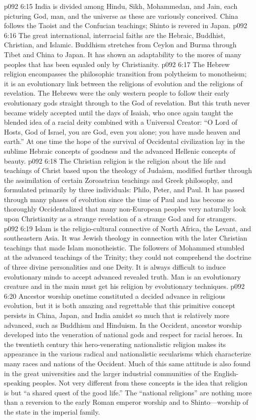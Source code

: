 \vs p092 6:15 India is divided among Hindu, Sikh, Mohammedan, and Jain, each picturing God, man, and the universe as these are variously conceived. China follows the Taoist and the Confucian teachings; Shinto is revered in Japan.
\vs p092 6:16 The great international, interracial faiths are the Hebraic, Buddhist, Christian, and Islamic. Buddhism stretches from Ceylon and Burma through Tibet and China to Japan. It has shown an adaptability to the mores of many peoples that has been equaled only by Christianity.
\vs p092 6:17 The Hebrew religion encompasses the philosophic transition from polytheism to monotheism; it is an evolutionary link between the religions of evolution and the religions of revelation. The Hebrews were the only western people to follow their early evolutionary gods straight through to the God of revelation. But this truth never became widely accepted until the days of Isaiah, who once again taught the blended idea of a racial deity combined with a Universal Creator: “O Lord of Hosts, God of Israel, you are God, even you alone; you have made heaven and earth.” At one time the hope of the survival of Occidental civilization lay in the sublime Hebraic concepts of goodness and the advanced Hellenic concepts of beauty.\plusone
\vs p092 6:18 The Christian religion is the religion about the life and teachings of Christ based upon the theology of Judaism, modified further through the assimilation of certain Zoroastrian teachings and Greek philosophy, and formulated primarily by three individuals: Philo, Peter, and Paul. It has passed through many phases of evolution since the time of Paul and has become so thoroughly Occidentalized that many non\hyp{}European peoples very naturally look upon Christianity as a strange revelation of a strange God and for strangers.
\vs p092 6:19 Islam is the religio\hyp{}cultural connective of North Africa, the Levant, and southeastern Asia. It was Jewish theology in connection with the later Christian teachings that made Islam monotheistic. The followers of Mohammed stumbled at the advanced teachings of the Trinity; they could not comprehend the doctrine of three divine personalities and one Deity. It is always difficult to induce evolutionary minds  to accept advanced revealed truth. Man is an evolutionary creature and in the main must get his religion by evolutionary techniques.
\pc \vs p092 6:20 Ancestor worship onetime constituted a decided advance in religious evolution, but it is both amazing and regrettable that this primitive concept persists in China, Japan, and India amidst so much that is relatively more advanced, such as Buddhism and Hinduism. In the Occident, ancestor worship developed into the veneration of national gods and respect for racial heroes. In the twentieth century this hero\hyp{}venerating nationalistic religion makes its appearance in the various radical and nationalistic secularisms which characterize many races and nations of the Occident. Much of this same attitude is also found in the great universities and the larger industrial communities of the English\hyp{}speaking peoples. Not very different from these concepts is the idea that religion is but “a shared quest of the good life.” The “national religions” are nothing more than a reversion to the early Roman emperor worship and to Shinto---worship of the state in the imperial family.
